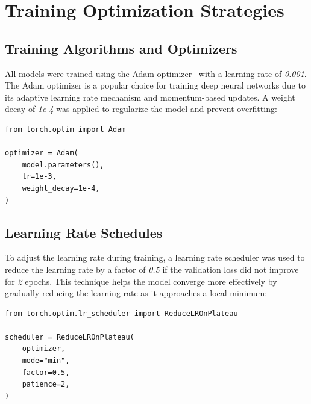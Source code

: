 \section{Training Optimization Strategies}

\subsection{Training Algorithms and Optimizers}\label{subsec:training-algorithms-optimizers}

All models were trained using the Adam optimizer~\cite{kingma2017adammethodstochasticoptimization} with a learning rate of \textit{0.001}. The Adam optimizer is a popular choice for training deep neural networks due to its adaptive learning rate mechanism and momentum-based updates. A weight decay of \textit{1e-4} was applied to regularize the model and prevent overfitting:

\begin{minipage}{0.9\linewidth}\begin{lstlisting}[caption={Adam optimizer with weight decay.},label={lst:adam-optimizer}]
from torch.optim import Adam

optimizer = Adam(
    model.parameters(),
    lr=1e-3,
    weight_decay=1e-4,
)
\end{lstlisting}\end{minipage}

\subsection{Learning Rate Schedules}

To adjust the learning rate during training, a learning rate scheduler was used to reduce the learning rate by a factor of \textit{0.5} if the validation loss did not improve for \textit{2} epochs. This technique helps the model converge more effectively by gradually reducing the learning rate as it approaches a local minimum:

\begin{minipage}{0.9\linewidth}\begin{lstlisting}[caption={ReduceLROnPlateau learning rate scheduler.},label={lst:lr-scheduler}]
from torch.optim.lr_scheduler import ReduceLROnPlateau

scheduler = ReduceLROnPlateau(
    optimizer,
    mode="min",
    factor=0.5,
    patience=2,
)
\end{lstlisting}\end{minipage}


